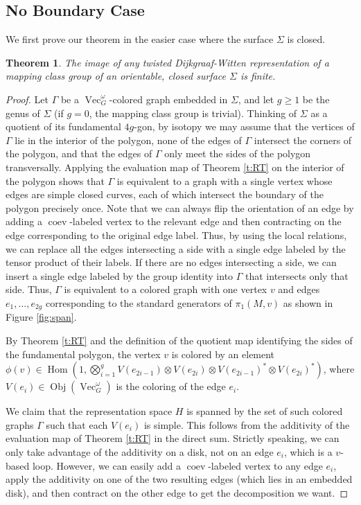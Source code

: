 \documentclass{amsart}
\newtheorem{thm}{Theorem}[section]
\DeclareMathOperator{\Vect}{Vec}
\DeclareMathOperator{\Hom}{Hom}
\DeclareMathOperator{\Obj}{Obj}
\DeclareMathOperator{\coev}{coev}
\newcommand{\one}{1}
\newcommand{\Si}{\Sigma}
\begin{document}
\subsection{No Boundary Case}

We first prove our theorem in the easier case where the surface $\Si$ is closed.  

\begin{thm}\label{thm:closed}
The image of any twisted Dijkgraaf-Witten representation of a mapping class group of an orientable, closed surface $\Si$ is finite.
\end{thm}

\begin{proof}
Let $\Gamma$ be a $\Vect_G^\omega$-colored graph embedded in $\Si$, and let $g \ge 1$ be the genus of $\Si$ (if $g = 0$, the mapping class group is trivial). Thinking of $\Si$ as a quotient of its fundamental $4g$-gon, by isotopy we may assume that the vertices of $\Gamma$ lie in the interior of the polygon, none of the edges of $\Gamma$ intersect the corners of the polygon, and that the edges of $\Gamma$ only meet the sides of the polygon transversally.  Applying the evaluation map of Theorem \ref{t:RT} on the interior of the polygon shows that $\Gamma$ is equivalent to a graph with a single vertex whose edges are simple closed curves, each of which intersect the boundary of the polygon precisely once. Note that we can always flip the orientation of an edge by adding a $\coev$-labeled vertex to the relevant edge and then contracting on the edge corresponding to the original edge label.   Thus, by using the local relations, we can replace all the edges intersecting a side with a single edge labeled by the tensor product of their labels.     If there are no edges intersecting a side, we can insert a single edge labeled by the group identity into $\Gamma$ that intersects only that side.  Thus, $\Gamma$ is equivalent to a colored graph with one vertex $v$ and edges $e_1, \ldots, e_{2g}$ corresponding to the standard generators of $\pi_1(M,v)$ as shown in Figure \ref{fig:span}.

By Theorem \ref{t:RT} and the definition of the quotient map identifying the sides of the fundamental polygon, the vertex $v$ is colored by an element $\phi(v) \in \Hom (\one, \bigotimes_{i=1}^g V(e_{2i-1}) \otimes V(e_{2i})  \otimes V(e_{2i-1})^* \otimes V(e_{2i})^*)$, where $V(e_i) \in \Obj(\Vect_G^\omega)$ is the coloring of the edge $e_i$.   

We claim that the representation space $H$ is spanned by the set of such colored graphs $\Gamma$ such that each $V(e_i)$ is simple. This follows from the additivity of the evaluation map of Theorem \ref{t:RT} in the direct sum.   Strictly speaking, we can only take advantage of the additivity on a disk, not on an edge $e_i$, which is a $v$-based loop. However, we can easily add a $\coev$-labeled vertex to any edge $e_i$, apply the additivity on one of the two resulting edges (which lies in an embedded disk), and then contract on the other edge to get the decomposition we want.


\end{proof}
\end{document}
